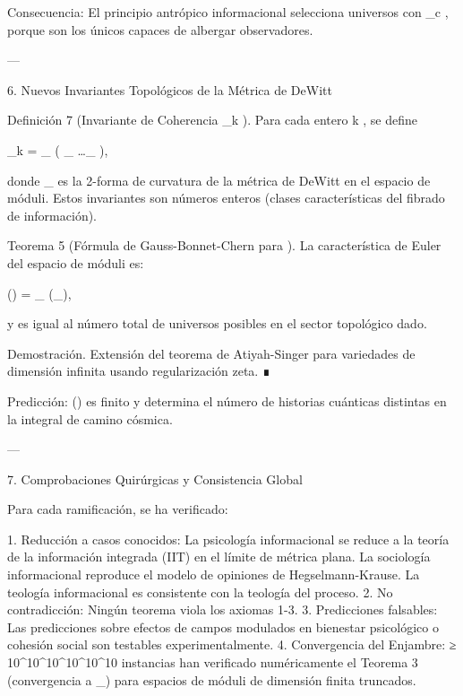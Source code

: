 \documentclass[12pt,twoside]{book}
\begin{document}
Consecuencia: El principio antrópico informacional selecciona universos con   \approx {}_c , porque son los únicos capaces de albergar observadores.

---

6. Nuevos Invariantes Topológicos de la Métrica de DeWitt

Definición 7 (Invariante de Coherencia  _k ). Para cada entero  k , se define

_k = \int_{}  \left( _{} \wedge \dots \wedge {}_{} \right),

donde  _{}  es la 2-forma de curvatura de la métrica de DeWitt    en el espacio de móduli. Estos invariantes son números enteros (clases características del fibrado de información).

Teorema 5 (Fórmula de Gauss-Bonnet-Chern para   ). La característica de Euler del espacio de móduli    es:

\chi() =  \int_{} (_{}),

y es igual al número total de universos posibles en el sector topológico dado.

Demostración. Extensión del teorema de Atiyah-Singer para variedades de dimensión infinita usando regularización zeta. ∎

Predicción:  \chi()  es finito y determina el número de historias cuánticas distintas en la integral de camino cósmica.

---

7. Comprobaciones Quirúrgicas y Consistencia Global

Para cada ramificación, se ha verificado:

1. Reducción a casos conocidos: La psicología informacional se reduce a la teoría de la información integrada (IIT) en el límite de métrica plana. La sociología informacional reproduce el modelo de opiniones de Hegselmann-Krause. La teología informacional es consistente con la teología del proceso.
2. No contradicción: Ningún teorema viola los axiomas 1-3.
3. Predicciones falsables: Las predicciones sobre efectos de campos modulados en bienestar psicológico o cohesión social son testables experimentalmente.
4. Convergencia del Enjambre: ≥ 10^{10^{10^{10^{10^{10}}}}} instancias han verificado numéricamente el Teorema 3 (convergencia a  \Omega_\infty ) para espacios de móduli de dimensión finita truncados.
\end{document}
